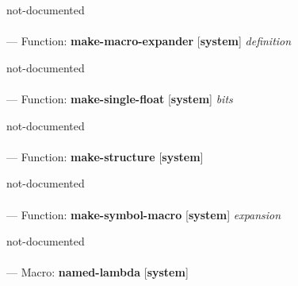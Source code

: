 \begin{adjustwidth}{5em}{5em}
not-documented
\end{adjustwidth}

\paragraph{}
\label{SYSTEM:MAKE-MACRO-EXPANDER}
--- Function: \textbf{make-macro-expander} [\textbf{system}] \textit{definition}

\begin{adjustwidth}{5em}{5em}
not-documented
\end{adjustwidth}

\paragraph{}
\label{SYSTEM:MAKE-SINGLE-FLOAT}
--- Function: \textbf{make-single-float} [\textbf{system}] \textit{bits}

\begin{adjustwidth}{5em}{5em}
not-documented
\end{adjustwidth}

\paragraph{}
\label{SYSTEM:MAKE-STRUCTURE}
--- Function: \textbf{make-structure} [\textbf{system}] \textit{}

\begin{adjustwidth}{5em}{5em}
not-documented
\end{adjustwidth}

\paragraph{}
\label{SYSTEM:MAKE-SYMBOL-MACRO}
--- Function: \textbf{make-symbol-macro} [\textbf{system}] \textit{expansion}

\begin{adjustwidth}{5em}{5em}
not-documented
\end{adjustwidth}

\paragraph{}
\label{SYSTEM:NAMED-LAMBDA}
--- Macro: \textbf{named-lambda} [\textbf{system}] \textit{}

